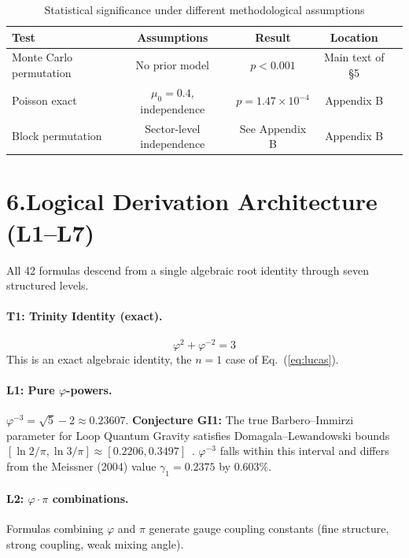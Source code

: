 \documentclass[10pt,a4paper]{article}
\begin{document}
\begin{table}[ht]
\centering
\begin{tabular}{l c c c c}
\toprule
\textbf{Test} & \textbf{Assumptions} & \textbf{Result} & \textbf{Location} \\
\midrule
Monte Carlo permutation & No prior model & $p < 0.001$ & Main text of \S5 \\
Poisson exact & $\mu_0 = 0.4$, independence & $p = 1.47 \times 10^{-4}$ & Appendix B \\
Block permutation & Sector-level independence & See Appendix B & Appendix B \\
\bottomrule
\end{tabular}
\caption{Statistical significance under different methodological assumptions}
\end{table}

\section*{6.\quad Logical Derivation Architecture (L1--L7)}

All 42 formulas descend from a single algebraic root identity through seven structured levels.

\paragraph{T1: Trinity Identity (exact).}
\begin{equation}
  \varphi^2 + \varphi^{-2} = 3
  \label{eq:trinity}
\end{equation}
This is an exact algebraic identity, the $n=1$ case of Eq.~(\ref{eq:lucas}).

\paragraph{L1: Pure $\varphi$-powers.}
$\varphi^{-3} = \sqrt{5} - 2 \approx 0.23607$.
\textbf{Conjecture GI1:} The true Barbero--Immirzi parameter for Loop Quantum Gravity
satisfies Domagala--Lewandowski bounds $[\ln 2/\pi, \ln 3/\pi] \approx [0.2206, 0.3497]$~\cite{meissner2004}.
$\varphi^{-3}$ falls within this interval and differs from the Meissner (2004) value
$\gamma_1 = 0.2375$ by $0.603\%$.

\paragraph{L2: $\varphi\cdot\pi$ combinations.}
Formulas combining $\varphi$ and $\pi$ generate gauge coupling constants (fine structure, strong
coupling, weak mixing angle).
\end{document}
